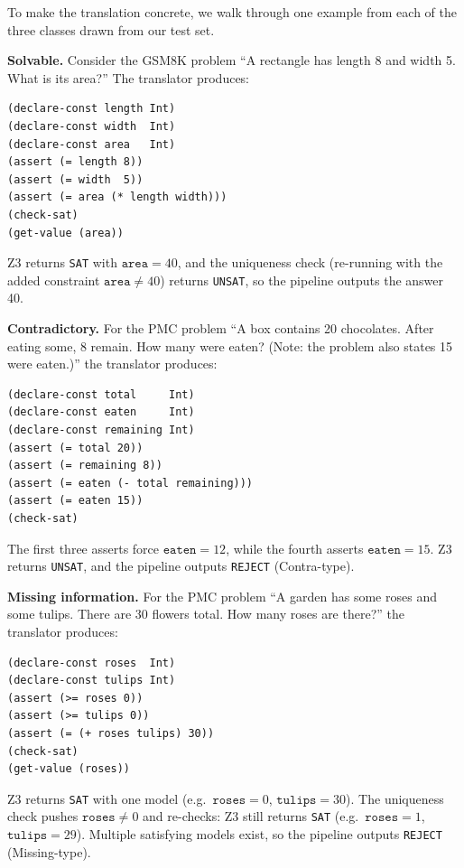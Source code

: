 \documentclass[sigconf, nonacm, onecolumn]{acmart}
\begin{document}
To make the translation concrete, we walk through one example from each of
the three classes drawn from our test set.

\textbf{Solvable.} Consider the GSM8K problem ``A rectangle has length 8
and width 5. What is its area?'' The translator produces:

\begin{verbatim}
(declare-const length Int)
(declare-const width  Int)
(declare-const area   Int)
(assert (= length 8))
(assert (= width  5))
(assert (= area (* length width)))
(check-sat)
(get-value (area))
\end{verbatim}

\noindent Z3 returns \texttt{SAT} with $\texttt{area} = 40$, and the
uniqueness check (re-running with the added constraint
$\texttt{area} \neq 40$) returns \texttt{UNSAT}, so the pipeline outputs
the answer 40.

\textbf{Contradictory.} For the PMC problem ``A box contains 20
chocolates. After eating some, 8 remain. How many were eaten? (Note: the
problem also states 15 were eaten.)'' the translator produces:

\begin{verbatim}
(declare-const total     Int)
(declare-const eaten     Int)
(declare-const remaining Int)
(assert (= total 20))
(assert (= remaining 8))
(assert (= eaten (- total remaining)))
(assert (= eaten 15))
(check-sat)
\end{verbatim}

\noindent The first three asserts force $\texttt{eaten} = 12$, while the
fourth asserts $\texttt{eaten} = 15$. Z3 returns \texttt{UNSAT}, and the
pipeline outputs \texttt{REJECT} (Contra-type).

\textbf{Missing information.} For the PMC problem ``A garden has some
roses and some tulips. There are 30 flowers total. How many roses are
there?'' the translator produces:

\begin{verbatim}
(declare-const roses  Int)
(declare-const tulips Int)
(assert (>= roses 0))
(assert (>= tulips 0))
(assert (= (+ roses tulips) 30))
(check-sat)
(get-value (roses))
\end{verbatim}

\noindent Z3 returns \texttt{SAT} with one model (e.g.\ $\texttt{roses}
= 0$, $\texttt{tulips} = 30$). The uniqueness check pushes
$\texttt{roses} \neq 0$ and re-checks: Z3 still returns \texttt{SAT}
(e.g.\ $\texttt{roses} = 1$, $\texttt{tulips} = 29$). Multiple
satisfying models exist, so the pipeline outputs \texttt{REJECT}
(Missing-type).
\end{document}
